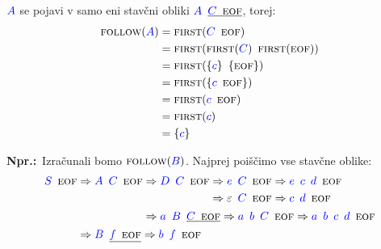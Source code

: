 \documentclass{article}
\newcommand{\Ex}{\textbf{Npr.:}\ }
\newcommand{\FIRST}{\textsc{first}}
\newcommand{\FOLLOW}{\textsc{follow}}
\newcommand{\EOF}{\textsc{eof}}
\newcommand{\Symbol}[1]{\textcolor{blue}{#1}}
\newcommand{\Null}{\varepsilon}
\newcommand{\Derive}{\Rightarrow}
\newcommand{\Seq}{{\ \,}}
\begin{document}
$\Symbol{A}$ se pojavi v samo eni stavčni obliki $\Symbol{A} \Seq \underline{\Symbol{C} \Seq \EOF}$, torej:
\begin{align*}
  \FOLLOW(\Symbol{A}) &= \FIRST(\Symbol{C} \Seq \EOF) \\
             &= \FIRST(\FIRST(\Symbol{C}) \Seq \FIRST(\EOF))\\
             &= \FIRST(\{\Symbol{c}\} \Seq \{\EOF\})\\
             &= \FIRST(\{\Symbol{c} \Seq \EOF\})\\
             &= \FIRST(\Symbol{c} \Seq \EOF) \\
             &= \FIRST(\Symbol{c})\\
             &= \{\Symbol{c}\}
\end{align*}

\Ex Izračunali bomo $\FOLLOW(\Symbol{B})$.
Najprej poiščimo vse stavčne oblike:
\begin{equation*}
  \Symbol{S} \Seq \EOF \begin{aligned}[t]
    &\Derive \Symbol{A} \Seq \Symbol{C} \Seq \EOF \begin{aligned}[t]
      &\Derive \Symbol{D} \Seq \Symbol{C} \Seq \EOF \begin{aligned}[t]
        &\Derive \Symbol{e} \Seq \Symbol{C} \Seq \EOF \Derive \Symbol{e} \Seq \Symbol{c} \Seq \Symbol{d} \Seq \EOF \\
        &\Derive \Null \Seq \Symbol{C} \Seq \EOF \Derive \Symbol{c} \Seq \Symbol{d} \Seq \EOF \\
      \end{aligned}\\
      &\Derive \Symbol{a} \Seq \Symbol{B} \Seq \underline{\Symbol{C} \Seq \EOF} \Derive \Symbol{a} \Seq \Symbol{b} \Seq \Symbol{C} \Seq \EOF \Derive \Symbol{a} \Seq \Symbol{b} \Seq \Symbol{c} \Seq \Symbol{d} \Seq \EOF
    \end{aligned}\\
    &\Derive \Symbol{B} \Seq \underline{\Symbol{f} \Seq \EOF} \Derive \Symbol{b} \Seq \Symbol{f} \Seq \EOF
  \end{aligned}
\end{equation*}
\end{document}
